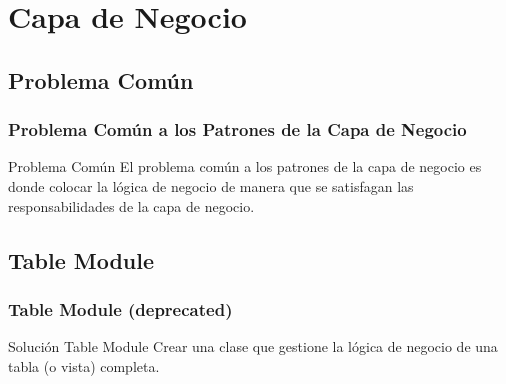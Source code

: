 \documentclass[a4paper,slidestop,xcolor=pst,dvips,blue]{beamer}
\begin{document}
%

\section{Capa de Negocio}

\subsection{Problema Común}

\begin{frame}
    \frametitle{Problema Común a los Patrones de la Capa de Negocio}
    \begin{block}{Problema Común}
        El problema común a los patrones de la capa de negocio es donde colocar la 
        lógica de negocio de manera que se satisfagan las responsabilidades de la capa de negocio.
    \end{block}
\end{frame}

\subsection{Table Module}

\begin{frame}[c]
    \frametitle{Table Module (deprecated)}
    \begin{block}{Solución Table Module}
        Crear una clase que gestione la lógica de negocio de una tabla (o vista) completa. 
    \end{block}
\end{frame}
\end{document}
